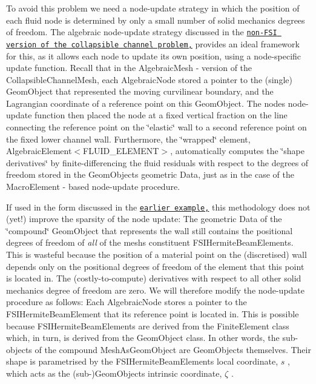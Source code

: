 To avoid this problem we need a node-\/update strategy in which the position of each fluid node is determined by only a small number of solid mechanics degrees of freedom. The algebraic node-\/update strategy discussed in the \href{../../../navier_stokes/algebraic_collapsible_channel/html/index.html}{\tt non-\/\+F\+SI version of the collapsible channel problem,} provides an ideal framework for this, as it allows each node to update its own position, using a node-\/specific update function. Recall that in the {\ttfamily Algebraic\+Mesh} -\/ version of the {\ttfamily Collapsible\+Channel\+Mesh}, each {\ttfamily Algebraic\+Node} stored a pointer to the (single) {\ttfamily Geom\+Object} that represented the moving curvilinear boundary, and the Lagrangian coordinate of a reference point on this {\ttfamily Geom\+Object}. The node\textquotesingle{}s node-\/update function then placed the node at a fixed vertical fraction on the line connecting the reference point on the \char`\"{}elastic\char`\"{} wall to a second reference point on the fixed lower channel wall. Furthermore, the \char`\"{}wrapped\char`\"{} element, {\ttfamily Algebraic\+Element$<$\+F\+L\+U\+I\+D\+\_\+\+E\+L\+E\+M\+E\+N\+T$>$}, automatically computes the \char`\"{}shape derivatives\char`\"{} by finite-\/differencing the fluid residuals with respect to the degrees of freedom stored in the {\ttfamily Geom\+Object\textquotesingle{}s} geometric {\ttfamily Data}, just as in the case of the {\ttfamily Macro\+Element} -\/ based node-\/update procedure.

If used in the form discussed in the \href{../../../navier_stokes/algebraic_collapsible_channel/html/index.html}{\tt earlier example,} this methodology does not (yet!) improve the sparsity of the node update\+: The geometric {\ttfamily Data} of the \char`\"{}compound\char`\"{} {\ttfamily Geom\+Object} that represents the wall still contains the positional degrees of freedom of {\itshape all} of the mesh\textquotesingle{}s constituent {\ttfamily F\+S\+I\+Hermite\+Beam\+Elements}. This is wasteful because the position of a material point on the (discretised) wall depends only on the positional degrees of freedom of the element that this point is located in. The (costly-\/to-\/compute) derivatives with respect to all other solid mechanics degree of freedom are zero. We will therefore modify the node-\/update procedure as follows\+: Each {\ttfamily Algebraic\+Node} stores a pointer to the {\ttfamily F\+S\+I\+Hermite\+Beam\+Element} that its reference point is located in. This is possible because {\ttfamily F\+S\+I\+Hermite\+Beam\+Elements} are derived from the {\ttfamily Finite\+Element} class which, in turn, is derived from the {\ttfamily Geom\+Object} class. In other words, the sub-\/objects of the compound {\ttfamily Mesh\+As\+Geom\+Object} are {\ttfamily Geom\+Objects} themselves. Their shape is parametrised by the {\ttfamily F\+S\+I\+Hermite\+Beam\+Element\textquotesingle{}s} local coordinate, $ s $ , which acts as the (sub-\/){\ttfamily Geom\+Object\textquotesingle{}s} intrinsic coordinate, $ \zeta $ .

